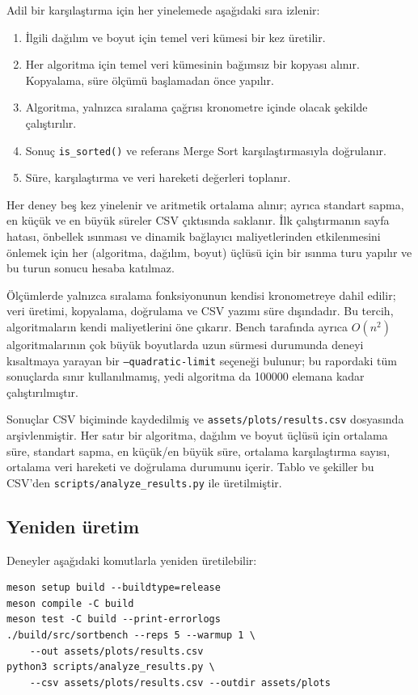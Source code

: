 \documentclass[12pt,a4paper]{article}
\begin{document}
Adil bir karşılaştırma için her yinelemede aşağıdaki sıra izlenir:

\begin{enumerate}
  \item İlgili dağılım ve boyut için temel veri kümesi bir kez üretilir.
  \item Her algoritma için temel veri kümesinin bağımsız bir kopyası alınır.
        Kopyalama, süre ölçümü başlamadan önce yapılır.
  \item Algoritma, yalnızca sıralama çağrısı kronometre içinde olacak şekilde
        çalıştırılır.
  \item Sonuç \texttt{is\_sorted()} ve referans Merge Sort karşılaştırmasıyla
        doğrulanır.
  \item Süre, karşılaştırma ve veri hareketi değerleri toplanır.
\end{enumerate}

Her deney beş kez yinelenir ve aritmetik ortalama alınır; ayrıca standart
sapma, en küçük ve en büyük süreler CSV çıktısında saklanır. İlk çalıştırmanın
sayfa hatası, önbellek ısınması ve dinamik bağlayıcı maliyetlerinden etkilenmesini
önlemek için her (algoritma, dağılım, boyut) üçlüsü için bir ısınma turu yapılır
ve bu turun sonucu hesaba katılmaz.

Ölçümlerde yalnızca sıralama fonksiyonunun kendisi kronometreye dahil edilir;
veri üretimi, kopyalama, doğrulama ve CSV yazımı süre dışındadır. Bu tercih,
algoritmaların kendi maliyetlerini öne çıkarır. Bench tarafında ayrıca
$O(n^2)$ algoritmalarının çok büyük boyutlarda uzun sürmesi durumunda deneyi
kısaltmaya yarayan bir \texttt{--quadratic-limit} seçeneği bulunur; bu rapordaki
tüm sonuçlarda sınır kullanılmamış, yedi algoritma da 100000 elemana kadar
çalıştırılmıştır.

Sonuçlar CSV biçiminde kaydedilmiş ve \texttt{assets/plots/results.csv}
dosyasında arşivlenmiştir. Her satır bir algoritma, dağılım ve boyut üçlüsü için
ortalama süre, standart sapma, en küçük/en büyük süre, ortalama karşılaştırma
sayısı, ortalama veri hareketi ve doğrulama durumunu içerir. Tablo ve şekiller bu
CSV'den \texttt{scripts/analyze\_results.py} ile üretilmiştir.

\subsection{Yeniden üretim}

Deneyler aşağıdaki komutlarla yeniden üretilebilir:

\begin{verbatim}
meson setup build --buildtype=release
meson compile -C build
meson test -C build --print-errorlogs
./build/src/sortbench --reps 5 --warmup 1 \
    --out assets/plots/results.csv
python3 scripts/analyze_results.py \
    --csv assets/plots/results.csv --outdir assets/plots
\end{verbatim}
\end{document}
